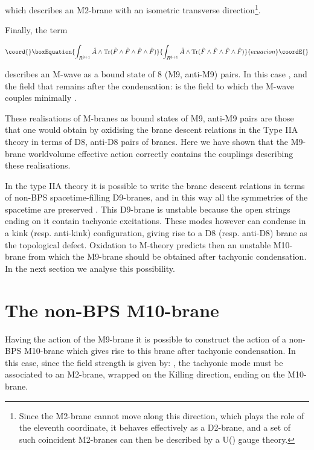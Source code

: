 \documentclass[12pt,a4paper]{article}
\begin{document}
\noindent which describes an M2-brane with an isometric transverse
direction\footnote{Since the M2-brane cannot move along this direction,
which plays the role of the eleventh coordinate,
it behaves effectively as a D2-brane, and a set of such coincident
M2-branes can then be described by a U(\coordHE{}) gauge theory.}.

Finally, the term

\begin{equation}\coord{}\boxEquation{
\int_{R^{8+1}}{\hat A}\wedge {\rm Tr}({\hat F}\wedge {\hat F}\wedge
{\hat F}\wedge {\hat F})
}{
\int_{R^{8+1}}{\hat A}\wedge {\rm Tr}({\hat F}\wedge {\hat F}\wedge
{\hat F}\wedge {\hat F})
}{ecuacion}\coordE{}\end{equation}

\noindent describes an M-wave as a bound state of 8 (M9, anti-M9) pairs.
In this case \coordHE{}, and the field that remains after the
condensation:
\coordHE{}
is the field to which the M-wave couples minimally \cite{BT}.

These realisations of M-branes as bound states of M9, anti-M9 pairs 
are those that one would obtain by oxidising the 
brane descent relations in the Type IIA theory in terms of D8, 
anti-D8 pairs of branes. Here we have
shown that the M9-brane worldvolume effective action correctly contains
the couplings describing these realisations.
 
In the type IIA theory it is possible to write the brane descent
relations in terms of non-BPS spacetime-filling D9-branes, and in this
way all the symmetries of the spacetime are preserved \cite{Horava}.
This D9-brane is unstable because the open strings ending on it
contain tachyonic excitations. These modes however can condense in a 
kink (resp. anti-kink) configuration, giving rise to a D8 (resp. anti-D8) 
brane as the topological
defect. Oxidation to M-theory predicts then an unstable M10-brane
from which the M9-brane should be obtained after tachyonic 
condensation. In the next
section we analyse this possibility.

\section{The non-BPS M10-brane}


Having the action of the M9-brane it is
possible to construct the action of a non-BPS M10-brane which gives rise
to this brane after tachyonic condensation. In this case, since the
field strength \coordHE{} is given by: \coordHE{}, the tachyonic mode must be associated to an 
M2-brane, wrapped
on the Killing direction, ending on the M10-brane. 
\end{document}
